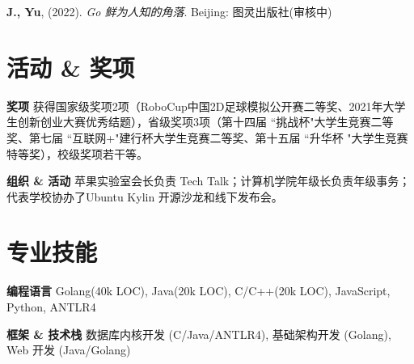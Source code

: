 \documentclass[letterpaper,10pt]{article}
\newcommand{\resumeItem}[2]{
  \item\small{
    \textbf{\:#1}{ #2 \vspace{-4pt}}
  }
}
\begin{document}
    \resumeItem{}{\textbf{J., Yu}, (2022). \textit{Go 鲜为人知的角落}. Beijing: 图灵出版社(审核中)}
    
\vspace{-5pt}
\section{活动 \& 奖项}
    
        \resumeItem{奖项}{获得国家级奖项2项（RoboCup中国2D足球模拟公开赛二等奖、2021年大学生创新创业大赛优秀结题），省级奖项3项（第十四届 ``挑战杯"大学生竞赛二等奖、第七届 ``互联网+"建行杯大学生竞赛二等奖、第十五届 ``升华杯 "大学生竞赛特等奖），校级奖项若干等。}
        \resumeItem{组织 \& 活动}{苹果实验室会长负责 Tech Talk；计算机学院年级长负责年级事务；代表学校协办了Ubuntu Kylin 开源沙龙和线下发布会。}
        
\vspace{-4pt}
\section{专业技能}
  	\resumeItem
      {编程语言}
      {Golang(40k LOC), Java(20k LOC), C/C++(20k LOC), JavaScript, Python, ANTLR4}
    \resumeItem
      {框架 \& 技术栈}
      {数据库内核开发 (C/Java/ANTLR4), 基础架构开发 (Golang), Web 开发 (Java/Golang)}


\end{document}
